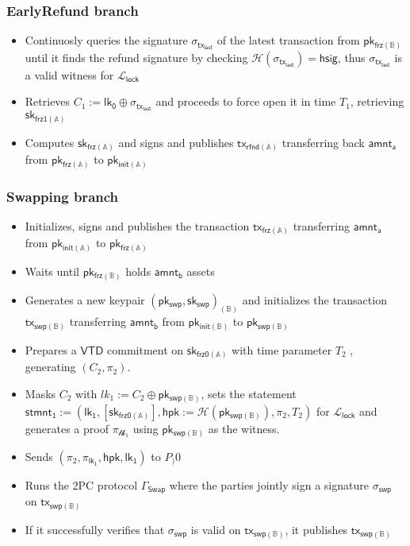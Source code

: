 \documentclass{article}      	%
\begin{document}
\subsubsection*{EarlyRefund branch}
\begin{itemize}
    \item Continuosly queries the signature $\sigma_{\mathsf{tx_{last}}}$ of the latest transaction from $\mathsf{pk_{frz(\mathbb{B})}}$ until it finds the refund signature by checking $\mathcal{H}(\sigma_{\mathsf{tx_{last}}}) = \mathsf{hsig}$, thus $\sigma_{\mathsf{tx_{last}}}$ is a valid witness for $\mathcal{L}_{\mathsf{lock}}$
    \item Retrieves $C_1 := \mathsf{lk_0} \oplus \sigma_{\mathsf{tx_{last}}}$ and proceeds to force open it in time $T_1$, retrieving $\mathsf{sk_{frz1(\mathbb{A})}}$
    \item Computes $\mathsf{sk_{frz(\mathbb{A})}}$ and signs and publishes $\mathsf{tx_{rfnd(\mathbb{A})}}$ transferring back $\mathsf{amnt_a}$ from $\mathsf{pk_{frz(\mathbb{A})}}$ to $\mathsf{pk_{init(\mathbb{A})}}$
\end{itemize}

\subsubsection*{Swapping branch}
\begin{itemize}
    \item Initializes, signs and publishes the transaction $\mathsf{tx_{frz(\mathbb{A})}}$ transferring $\mathsf{amnt_a}$ from $\mathsf{pk_{init(\mathbb{A})}}$ to $\mathsf{pk_{frz(\mathbb{A})}}$
    \item Waits until $\mathsf{pk_{frz(\mathbb{B})}}$ holds $\mathsf{amnt_b}$ assets
    \item Generates a new keypair $(\mathsf{pk_{swp}}, \mathsf{sk_{swp}})_{(\mathbb{B})}$ and initializes the transaction $\mathsf{tx_{swp(\mathbb{B})}}$ transferring $\mathsf{amnt_b}$ from $\mathsf{pk_{init(\mathbb{B})}}$ to $\mathsf{pk_{swp(\mathbb{B})}}$
    \item Prepares a $\mathsf{VTD}$ commitment on $\mathsf{sk_{frz0(\mathbb{A})}}$ with time parameter $T_2$ , generating $(C_2, \pi_2)$.
    \item Masks $C_2$ with $lk_1 := C_2 \oplus \mathsf{pk_{swp(\mathbb{B})}}$, sets the statement $\mathsf{stmnt_1} := (\mathsf{lk_1}, {[\mathsf{sk_{frz0(\mathbb{A})}}]}, \mathsf{hpk} := \mathcal{H}(\mathsf{pk_{swp(\mathbb{B})}}), \pi_2, T_2)$ for $\mathcal{L}_{\mathsf{lock}}$ and generates a proof $\pi_{\mathcal{lk_1}}$ using $\mathsf{pk_{swp(\mathbb{B})}}$ as the witness.
    \item Sends  $(\pi_2, \pi_{\mathsf{lk_1}}, \mathsf{hpk}, \mathsf{lk_1})$ to $P_)0$
    \item Runs the 2PC protocol $\Gamma_{\mathsf{Swap}}$ where the parties jointly sign a signature $\sigma_{\mathsf{swp}}$ on $\mathsf{tx_{swp(\mathbb{B})}}$
    \item If it successfully verifies that $\sigma_{\mathsf{swp}}$ is valid on $\mathsf{tx_{swp(\mathbb{B})}}$, it publishes $\mathsf{tx_{swp(\mathbb{B})}}$
\end{itemize}
\end{document}
